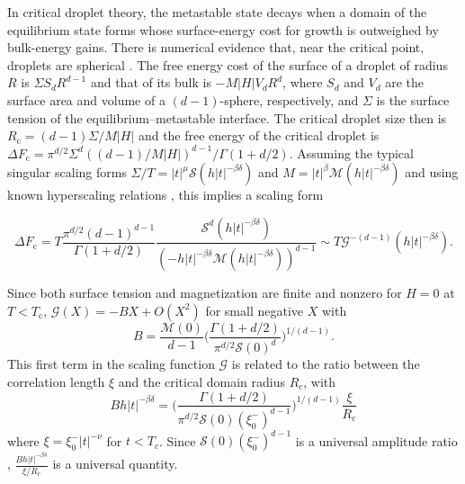 \documentclass[aps,prl,reprint]{revtex4-1}
\def\[{\begin{equation}}
\def\]{\end{equation}}
\def\O{O}          %
\def\c{\mathrm c}
\def\fM{\mathcal M}  %
\def\fS{\mathcal S}  %
\def\fG{\mathcal G}  %
\def\dim{d}
\newif\ifreprint
\begin{document}
In critical droplet theory, the metastable state decays when a domain of the
equilibrium state forms whose surface-energy cost for growth is outweighed by
bulk-energy gains. There is numerical evidence that, near the critical point,
droplets are spherical \cite{gunther.1993.transfer-matrix}. The free energy
cost of the surface of a droplet of radius $R$
is $\Sigma S_\dim R^{\dim-1}$ and that of its
bulk is $-M|H|V_\dim R^\dim$, where $S_\dim$ and $V_\dim$ are the surface area and
volume of a $(\dim-1)$-sphere, respectively, and $\Sigma$ is the surface tension of the equilibrium--metastable interface. The critical droplet size then is
$R_\c=(\dim-1)\Sigma/M|H|$ and the free energy of the critical
droplet is $\Delta
F_\c=\pi^{\dim/2}\Sigma^\dim((\dim-1)/M|H|)^{\dim-1}/\Gamma(1+\dim/2)$.  
Assuming the typical singular scaling forms
$\Sigma/T=|t|^\mu\fS(h|t|^{-\beta\delta})$ and $M=|t|^\beta\mathcal
M(h|t|^{-\beta\delta})$ and using known hyperscaling relations
\cite{widom.1981.interface}, this implies a scaling form
\def\eqcritformone{
  T\frac{\pi^{\dim/2}(\dim-1)^{\dim-1}}{\Gamma(1+\dim/2)}\frac{\fS^\dim(h|t|^{-\beta\delta})}{(-h|t|^{-\beta\delta}\fM(h|t|^{-\beta\delta}))^{\dim-1}}
}
\def\eqcritformtwo{
  T\fG^{-(\dim-1)}(h|t|^{-\beta\delta})
}
\ifreprint
\[
  \begin{aligned}
    \Delta F_\c
    &=\eqcritformone\\
    &\sim\eqcritformtwo.
  \end{aligned}
\]
\else
\[
  \Delta F_\c=\eqcritformone\sim\eqcritformtwo.
\]
\fi
Since both surface tension and magnetization are finite and nonzero for $H=0$
at $T<T_\c$, $\fG(X)=-BX+\O(X^2)$ for small negative $X$ with
\[
  B=\frac{\fM(0)}{\dim-1}\bigg(\frac{\Gamma(1+\dim/2)}{\pi^{\dim/2}\fS(0)^\dim}\bigg)^{1/(\dim-1)}.
\]
This first term in the scaling function $\fG$ is related to the ratio between the correlation length $\xi$
and the critical domain radius $R_c$, with
\[
  Bh|t|^{-\beta\delta}=\bigg(\frac{\Gamma(1+\dim/2)}{\pi^{\dim/2}\fS(0)(\xi_0^-)^{\dim-1}}\bigg)^{1/(\dim-1)}\frac\xi{R_\c}
\]
where $\xi=\xi_0^-|t|^{-\nu}$ for $t<T_c$. Since $\fS(0)(\xi_0^-)^{\dim-1}$ is a
universal amplitude ratio \cite{zinn.1996.universal}, $\frac{Bh|t|^{-\beta\delta}}{\xi/R_c}$ is a
universal quantity.
\end{document}
